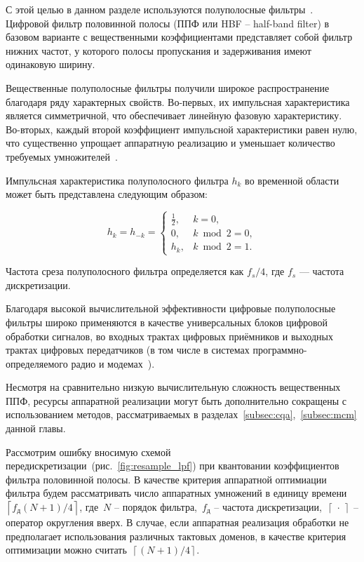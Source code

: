 С этой целью в данном разделе используются полуполосные фильтры~\cite{ch12_gockler}. Цифровой фильтр половинной полосы (ППФ или HBF -- half-band filter) в базовом варианте с вещественными коэффициентами представляет собой фильтр нижних частот, у которого полосы пропускания и задерживания имеют одинаковую ширину.

Вещественные полуполосные фильтры получили широкое распространение благодаря ряду характерных свойств. Во-первых, их импульсная характеристика является симметричной, что обеспечивает линейную фазовую характеристику. Во-вторых, каждый второй коэффициент импульсной характеристики равен нулю, что существенно упрощает аппаратную реализацию и уменьшает количество требуемых умножителей~\cite{ch12_gockler}.

Импульсная характеристика полуполосного фильтра $h_k$ во временной области может быть представлена следующим образом:

\begin{equation*}
	h_k = h_{-k} =
	\begin{cases}
		\frac{1}{2}, & k = 0, \\
		0, & k \bmod 2 = 0, \\
		h_k, & k \bmod 2 = 1.
	\end{cases}
\end{equation*}

Частота среза полуполосного фильтра определяется как $f_s/4$, где $f_s$ — частота дискретизации.

Благодаря высокой вычислительной эффективности цифровые полуполосные фильтры широко применяются в качестве универсальных блоков цифровой обработки сигналов, во входных трактах цифровых приёмников и выходных трактах цифровых передатчиков (в том числе в системах программно-определяемого радио и модемах~\cite{ren_multi_band}).

Несмотря на сравнительно низкую вычислительную сложность вещественных ППФ, ресурсы аппаратной реализации могут быть дополнительно сокращены с использованием методов, рассматриваемых в разделах~\ref{subsec:cqa},~\ref{subsec:mcm} данной главы. 

Рассмотрим ошибку вносимую схемой передискретизации~(рис.~\ref{fig:resample_lpf}) при квантовании коэффициентов фильтра половинной полосы. В качестве критерия аппаратной оптимиации фильтра будем рассматривать число аппаратных умножений в единицу времени~$\left \lceil{f_{\text{д}}(N+1)/4}\right \rceil$, где~$N$ -- порядок фильтра,~$f_{\text{д}}$ -- частота дискретизации,~$\left \lceil{ \ \cdot \ }\right \rceil$ -- оператор округления вверх. В случае, если аппаратная реализация обработки не предполагает использования различных тактовых доменов, в качестве критерия оптимизации можно считать~$\left \lceil{(N+1)/4}\right \rceil$.
	
